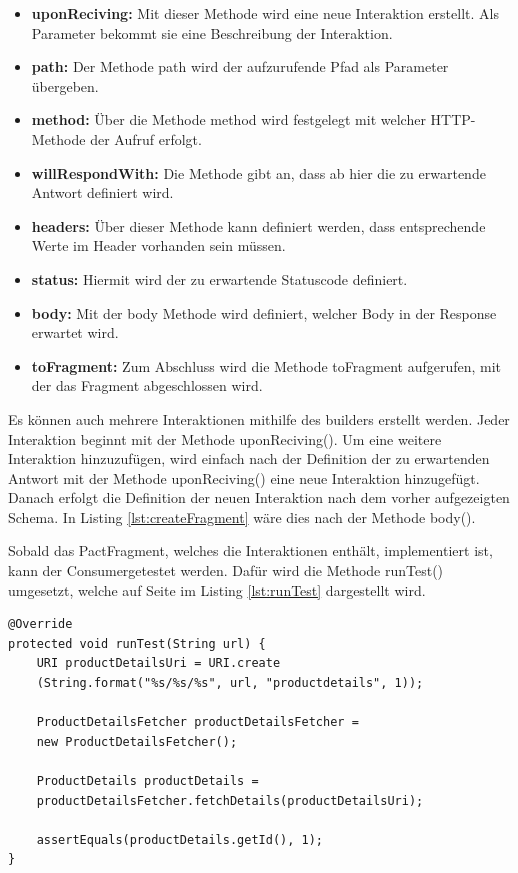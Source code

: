 \documentclass{llncs}
\begin{document}
\begin{itemize}
\item \textbf{uponReciving: } Mit dieser Methode wird eine neue Interaktion erstellt. Als Parameter bekommt sie eine Beschreibung der Interaktion.
\item \textbf{path: } Der Methode path wird der aufzurufende Pfad als Parameter übergeben.
\item \textbf{method: } Über die Methode method wird festgelegt mit welcher HTTP-Methode der Aufruf erfolgt.
\item \textbf{willRespondWith: } Die Methode gibt an, dass ab hier die zu erwartende Antwort definiert wird.
\item \textbf{headers: } Über dieser Methode kann definiert werden, dass entsprechende Werte im Header vorhanden sein müssen.
\item \textbf{status: } Hiermit wird der zu erwartende Statuscode definiert.
\item \textbf{body: } Mit der body Methode wird definiert, welcher Body in der Response erwartet wird.
\item \textbf{toFragment: } Zum Abschluss wird die Methode toFragment aufgerufen, mit der das Fragment abgeschlossen wird.
\end{itemize}

Es können auch mehrere Interaktionen mithilfe des builders erstellt werden. Jeder Interaktion beginnt mit der Methode uponReciving(). Um eine weitere Interaktion hinzuzufügen, wird einfach nach der Definition der zu erwartenden Antwort mit der Methode uponReciving() eine neue Interaktion hinzugefügt. Danach erfolgt die Definition der neuen Interaktion nach dem vorher aufgezeigten Schema. In Listing \ref{lst:createFragment} wäre dies nach der Methode body().

Sobald das PactFragment, welches die Interaktionen enthält, implementiert ist, kann der Consumergetestet werden. Dafür wird die Methode runTest() umgesetzt, welche auf Seite \pageref{lst:runTest} im Listing \ref{lst:runTest} dargestellt wird.

\lstset{language = Java}
\begin{lstlisting}[caption=Implementierung runTest(),label=lst:runTest]
@Override
protected void runTest(String url) {
    URI productDetailsUri = URI.create
    (String.format("%s/%s/%s", url, "productdetails", 1));

    ProductDetailsFetcher productDetailsFetcher = 
    new ProductDetailsFetcher();
    
    ProductDetails productDetails =  
    productDetailsFetcher.fetchDetails(productDetailsUri);
    
    assertEquals(productDetails.getId(), 1);
}
\end{lstlisting}
\end{document}
